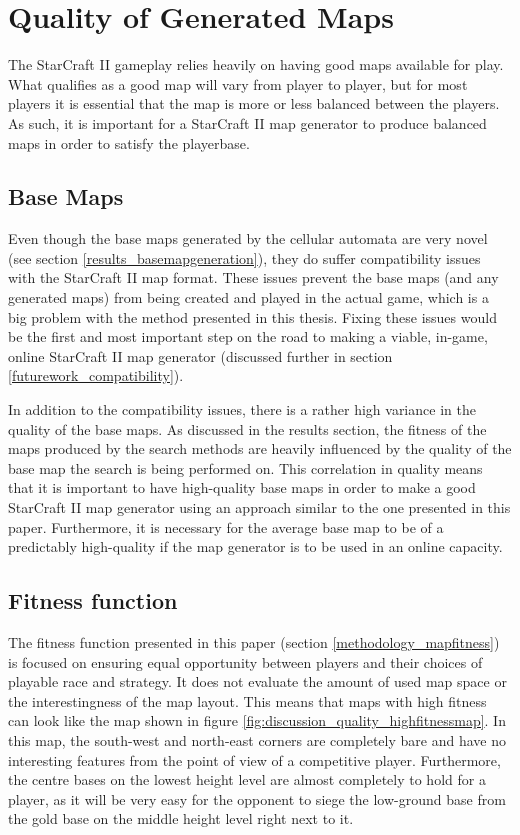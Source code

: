 \section{Quality of Generated Maps}
\label{discussion_quality}
The StarCraft II gameplay relies heavily on having good maps available for play. What qualifies as a good map will vary from player to player, but for most players it is essential that the map is more or less balanced between the players. As such, it is important for a StarCraft II map generator to produce balanced maps in order to satisfy the playerbase.

\subsection{Base Maps}
\label{discussion_quality_basemaps}
Even though the base maps generated by the cellular automata are very novel (see section \ref{results_basemapgeneration}), they do suffer compatibility issues with the StarCraft II map format. These issues prevent the base maps (and any generated maps) from being created and played in the actual game, which is a big problem with the method presented in this thesis. Fixing these issues would be the first and most important step on the road to making a viable, in-game, online StarCraft II map generator (discussed further in section \ref{futurework_compatibility}).

In addition to the compatibility issues, there is a rather high variance in the quality of the base maps. As discussed in the results section, the fitness of the maps produced by the search methods are heavily influenced by the quality of the base map the search is being performed on. This correlation in quality means that it is important to have high-quality base maps in order to make a good StarCraft II map generator using an approach similar to the one presented in this paper. Furthermore, it is necessary for the average base map to be of a predictably high-quality if the map generator is to be used in an online capacity. 

\subsection{Fitness function}
\label{discussion_quality_fitnessfunction}
The fitness function presented in this paper (section \ref{methodology_mapfitness}) is focused on ensuring equal opportunity between players and their choices of playable race and strategy. It does not evaluate the amount of used map space or the interestingness of the map layout. This means that maps with high fitness can look like the map shown in figure \ref{fig:discussion_quality_highfitnessmap}. In this map, the south-west and north-east corners are completely bare and have no interesting features from the point of view of a competitive player. Furthermore, the centre bases on the lowest height level are almost completely to hold for a player, as it will be very easy for the opponent to siege the low-ground base from the gold base on the middle height level right next to it.

